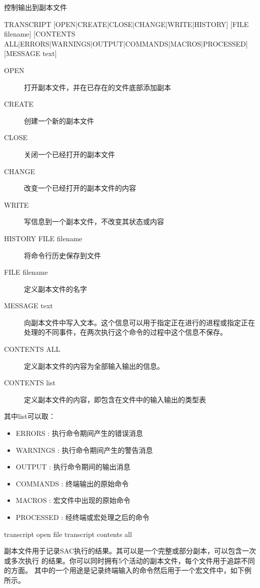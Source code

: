\label{cmd:transcript}

控制输出到副本文件

\begin{SACSTX}
TRANSCRIPT [OPEN|CREATE|CLOSE|CHANGE|WRITE|HISTORY] [FILE filename]  
    [CONTENTS ALL|ERRORS|WARNINGS|OUTPUT|COMMANDS|MACROS|PROCESSED] 
    [MESSAGE text]
\end{SACSTX}

\begin{description}
\item [OPEN] 打开副本文件，并在已存在的文件底部添加副本 
\item [CREATE] 创建一个新的副本文件 
\item [CLOSE] 关闭一个已经打开的副本文件 
\item [CHANGE] 改变一个已经打开的副本文件的内容 
\item [WRITE] 写信息到一个副本文件，不改变其状态或内容 
\item [HISTORY FILE filename] 将命令行历史保存到文件 
\item [FILE filename] 定义副本文件的名字 
\item [MESSAGE text] 向副本文件中写入文本。这个信息可以用于指定正在进行的进程或指定正在
    处理的不同事件，在两次执行这个命令的过程中这个信息不保存。 
\item [CONTENTS ALL] 定义副本文件的内容为全部输入输出的信息。 
\item [CONTENTS list] 定义副本文件的内容，即包含在文件中的输入输出的类型表
\end{description}
其中list可以取：
\begin{itemize}
\item ERRORS : 执行命令期间产生的错误消息
\item WARNINGS : 执行命令期间产生的警告消息
\item OUTPUT : 执行命令期间的输出消息 
\item COMMANDS : 终端输出的原始命令 
\item MACROS : 宏文件中出现的原始命令 
\item PROCESSED : 经终端或宏处理之后的命令
\end{itemize}

\begin{SACDFT}
transcript open file transcript contents all
\end{SACDFT}

副本文件用于记录SAC执行的结果。其可以是一个完整或部分副本，可以包含一次或多次执行
的结果。你可以同时拥有5个活动的副本文件，每个文件用于追踪不同的方面。
其中的一个用途是记录终端输入的命令然后用于一个宏文件中，如下例所示。

